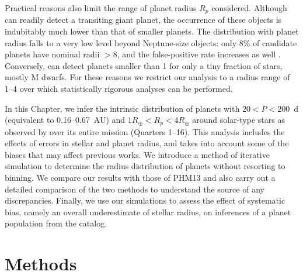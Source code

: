 Practical reasons also limit the range of planet radius $R_p$
considered.  Although \kep{} can readily detect a transiting giant
planet, the occurrence of these objects is indubitably much lower than
that of smaller planets.  The distribution with planet radius falls to
a very low level beyond Neptune-size objects: only 8\% of \kep{}
candidate planets have nominal radii $>8$\rearth{}, and the
false-positive rate increases as well \citep{Santerne2012,Colon2012}.
Conversely, \kep{} can detect planets smaller than 1\rearth{} for only
a tiny fraction of stars, mostly M dwarfs.  For these reasons we
restrict our analysis to a radius range of 1--4\rearth{} over which
statistically rigorous analyses can be performed. 

In this Chapter, we infer the intrinsic distribution of planets
with $20<P<200$~d (equivalent to 0.16--0.67~AU) and
$1 R_\oplus < R_p < 4R_\oplus$ around solar-type stars as
observed by \kep{} over
its entire mission (Quarters 1--16).  This analysis includes the
effects of errors in stellar and planet radius, and takes into account
some of the biases that may affect previous works.  We introduce a
method of iterative simulation to determine the radius distribution of
planets without resorting to binning.  We compare our results with
those of PHM13 and also carry out a detailed comparison of the two
methods to understand the source of any discrepancies.  Finally, we use our
simulations to assess the effect of systematic bias, namely an overall 
underestimate of stellar radius, on
inferences of a planet population from the \kep{} catalog.

\section{Methods}
\label{sec:methods}
